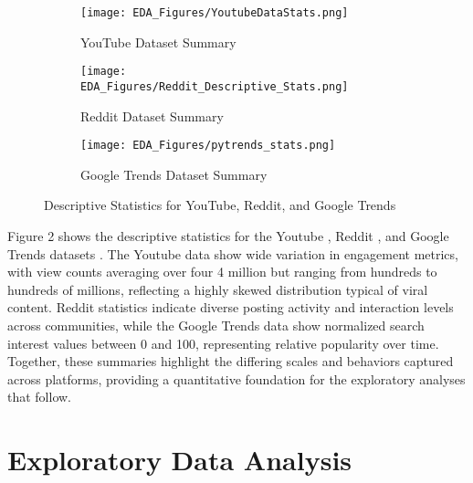 \documentclass{article}
\begin{document}
\begin{figure}[H]
    \centering
    
    \begin{subfigure}[t]{0.65\textwidth}
        \centering
        \texttt{[image: EDA\_Figures/YoutubeDataStats.png]}
        \caption{YouTube Dataset Summary}
        \label{fig:youtube-summary}
    \end{subfigure}

    \vspace{0.5cm} %

    \begin{subfigure}[t]{0.45\textwidth}
        \centering
        \texttt{[image: EDA\_Figures/Reddit\_Descriptive\_Stats.png]}
        \caption{Reddit Dataset Summary}
        \label{fig:reddit-summary}
    \end{subfigure}
    \hfill
    \begin{subfigure}[t]{0.45\textwidth}
        \centering
        \texttt{[image: EDA\_Figures/pytrends\_stats.png]}
        \caption{Google Trends Dataset Summary}
        \label{fig:pytrends-summary}
    \end{subfigure}

    \caption{Descriptive Statistics for YouTube, Reddit, and Google Trends}
    \label{fig:dataset-summaries}
\end{figure}

Figure 2 shows the descriptive statistics for the Youtube \citep{youtube_api}, Reddit \citep{reddit_api_praw}, and Google Trends datasets \citep{pytrends_api}. The Youtube data show wide variation in engagement metrics, with view counts averaging over four 4 million but ranging from hundreds to hundreds of millions, reflecting a highly skewed distribution typical of viral content. Reddit statistics indicate diverse posting activity and interaction levels across communities, while the Google Trends data show normalized search interest values between 0 and 100, representing relative popularity over time. Together, these summaries highlight the differing scales and behaviors captured across platforms, providing a quantitative foundation for the exploratory analyses that follow.

\newpage

\section{Exploratory Data Analysis}
\end{document}
